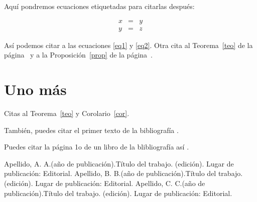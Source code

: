 \documentclass[12pt]{book}%
\theoremstyle{definition}%
\begin{document}
Aquí pondremos ecuaciones etiquetadas para citarlas después:

\begin{eqnarray}
x&=&y \label{eq1}\\
y&=&z \label{eq2}
\end{eqnarray}

Así podemos citar a las ecuaciones \eqref{eq1} y \eqref{eq2}. Otra cita al Teorema~\ref{teo} de la página~\pageref{teo} y a la Proposición~\ref{prop} de la página~\pageref{prop}.



\chapter{Uno más}

Citas al Teorema~\ref{teo} y Corolario~\ref{cor}.


También, puedes citar el primer texto de la bibliografía \cite{libro1}.

Puedes citar la página 1o de un libro de la blibliografía así \cite[pág 10]{libro2}.




\begin{thebibliography}{99}

 Apellido, A. A.(año de publicación).Título del trabajo. (edición). Lugar de publicación: Editorial.
 Apellido, B. B.(año de publicación).Título del trabajo. (edición). Lugar de publicación: Editorial.
 Apellido, C. C.(año de publicación).Título del trabajo. (edición). Lugar de publicación: Editorial.

\end{thebibliography}

\printindex
\end{document}

